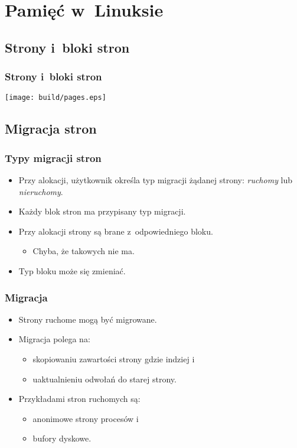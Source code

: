 \section{Pamięć w~Linuksie}

\subsection{Strony i~bloki stron}

\begin{frame}
  \frametitle{Strony i~bloki stron}
  \begin{center}
  \texttt{[image: build/pages.eps]}
  \end{center}
\end{frame}

\subsection{Migracja stron}

\begin{frame}
  \frametitle{Typy migracji stron}

  \begin{itemize}
  \item Przy alokacji, użytkownik określa typ migracji żądanej strony:
    \textit{ruchomy} lub \textit{nieruchomy}.
  \item Każdy blok stron ma przypisany typ migracji.
  \item Przy alokacji strony są brane z~odpowiedniego bloku.
    \begin{itemize}
    \item Chyba, że takowych nie ma.
    \end{itemize}
  \item Typ bloku może się zmieniać.
  \end{itemize}
\end{frame}

\begin{frame}[fragile]
  \frametitle{Migracja}

  \begin{itemize}
  \item Strony ruchome mogą być migrowane.
  \item Migracja polega na:
    \begin{itemize}
    \item skopiowaniu zawartości strony gdzie indziej i
    \item uaktualnieniu odwołań do starej strony.
    \end{itemize}
  \item Przykładami stron ruchomych są:
    \begin{itemize}
    \item anonimowe strony procesów i
    \item bufory dyskowe.
    \end{itemize}
  \end{itemize}
\end{frame}


